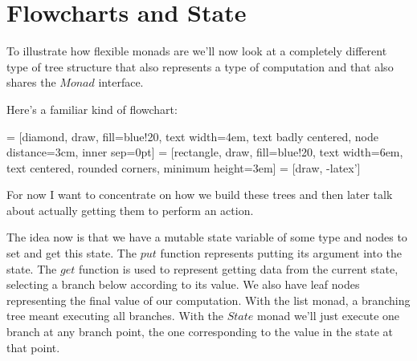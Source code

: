 \documentclass{article}
\newcommand{\Conid}[1]{\mathit{#1}}
\newcommand{\Varid}[1]{\mathit{#1}}
\begin{document}
\section{Flowcharts and State}
To illustrate how flexible monads are we'll now look at a completely different type of tree structure that also represents a type of computation and that also shares the \ensuremath{\Conid{Monad}} interface.

Here's a familiar kind of flowchart:

 = [diamond, draw, fill=blue!20, 
    text width=4em, text badly centered, node distance=3cm, inner sep=0pt]
 = [rectangle, draw, fill=blue!20, 
    text width=6em, text centered, rounded corners, minimum height=3em]
 = [draw, -latex']

\begin{center}
\end{center}

For now I want to concentrate on how we build these trees and then later talk about actually getting them to perform an action.

The idea now is that we have a mutable state variable of some type and nodes to set and get this state. The \ensuremath{\Varid{put}} function represents putting its argument into the state. The \ensuremath{\Varid{get}} function is used to represent getting data from the current state, selecting a branch below according to its value. We also have leaf nodes representing the final value of our computation. With the list monad, a branching tree meant executing all branches. With the \ensuremath{\Conid{State}} monad we'll just execute one branch at any branch point, the one corresponding to the value in the state at that point.
\end{document}

